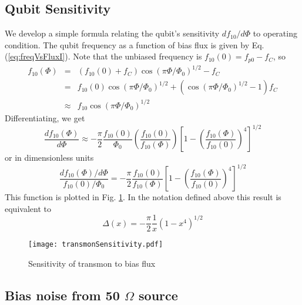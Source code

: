 \documentclass[twocolumn]{article}
\begin{document}
\subsection{Qubit Sensitivity}

We develop a simple formula relating the qubit's sensitivity $df_{10}/d\Phi$ to operating condition. The qubit frequency as a function of bias flux is given by Eq. (\ref{eq:freqVsFluxI}). Note that the unbiased frequency is $f_{10}(0) = f_{p0} - f_C$, so \begin{eqnarray*}
f_{10}(\Phi) &=& (f_{10}(0)+f_C)\cos \left( \pi \Phi/\Phi_0 \right)^{1/2} - f_C \\
&=& f_{10}(0)\cos \left( \pi \Phi/\Phi_0 \right)^{1/2} + \left( \cos \left( \pi \Phi/\Phi_0 \right)^{1/2} - 1\right)f_C \\
&\approx& f_{10}\cos \left( \pi \Phi/\Phi_0 \right)^{1/2} \end{eqnarray*}
Differentiating, we get \begin{equation}
\frac{df_{10}(\Phi)}{d\Phi} \approx - \frac{\pi}{2}\frac{f_{10}(0)}{\Phi_0}\left(\frac{f_{10}(0)}{f_{10}(\Phi)}\right) \left[1- \left(\frac{f_{10}(\Phi)}{f_{10}(0)}\right)^4 \right]^{1/2} \end{equation}
or in dimensionless units \begin{equation}
\frac{df_{10}(\Phi)/d\Phi}{f_{10}(0)/\Phi_0} = -\frac{\pi}{2}\frac{f_{10}(0)}{f_{10}(\Phi)} \left[1- \left(\frac{f_{10}(\Phi)}{f_{10}(0)}\right)^4 \right]^{1/2} \label{eq:transmonSensitivity} \end{equation}
This function is plotted in Fig. \ref{Fig:transmonSensitivity}. In the notation defined above this result is equivalent to \begin{equation}
\Delta(x) = -\frac{\pi}{2}\frac{1}{x}\left( 1 - x^4 \right)^{1/2} \end{equation}

\begin{figure}
\begin{centering}
\texttt{[image: transmonSensitivity.pdf]} 
\par\end{centering}
\caption{Sensitivity of transmon to bias flux}
\label{Fig:transmonSensitivity}
\end{figure}

\subsection{Bias noise from 50 $\Omega$ source}
\end{document}
